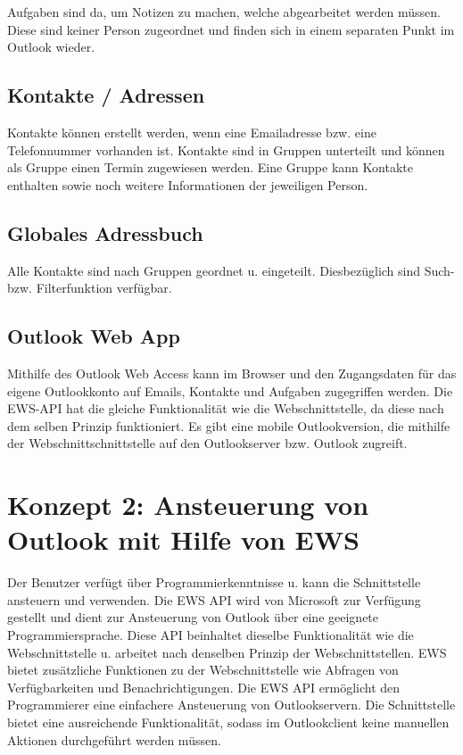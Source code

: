 Aufgaben sind da, um Notizen zu machen, welche abgearbeitet werden müssen. Diese sind keiner Person zugeordnet und finden sich in einem separaten Punkt im Outlook wieder.
\subsection{Kontakte / Adressen}
Kontakte können erstellt werden, wenn eine Emailadresse bzw. eine Telefonnummer vorhanden ist. Kontakte sind in Gruppen unterteilt und können als Gruppe einen Termin zugewiesen werden. Eine Gruppe kann Kontakte enthalten sowie noch weitere Informationen der jeweiligen Person. 
\subsection{Globales Adressbuch}
Alle Kontakte sind nach Gruppen geordnet u. eingeteilt. Diesbezüglich sind Such- bzw. Filterfunktion verfügbar.
\subsection{Outlook Web App}
Mithilfe des Outlook Web Access kann im Browser und den Zugangsdaten für das eigene Outlookkonto auf Emails, Kontakte und Aufgaben zugegriffen werden. Die EWS-API hat die gleiche Funktionalität wie die Webschnittstelle, da diese nach dem selben Prinzip funktioniert. Es gibt eine mobile Outlookversion, die mithilfe der Webschnittschnittstelle auf den Outlookserver bzw. Outlook zugreift.

\section{Konzept 2: Ansteuerung von Outlook mit Hilfe von EWS}
Der Benutzer verfügt über Programmierkenntnisse u. kann die Schnittstelle ansteuern und verwenden.
Die EWS API wird von Microsoft zur Verfügung gestellt und dient zur Ansteuerung von Outlook über eine geeignete Programmiersprache. Diese API beinhaltet dieselbe Funktionalität wie die Webschnittstelle u. arbeitet nach denselben Prinzip der Webschnittstellen. EWS bietet zusätzliche Funktionen zu der Webschnittstelle wie Abfragen von Verfügbarkeiten und Benachrichtigungen. Die EWS API ermöglicht den Programmierer eine einfachere Ansteuerung von Outlookservern. Die Schnittstelle bietet eine ausreichende Funktionalität, sodass im Outlookclient keine manuellen Aktionen durchgeführt werden müssen.

